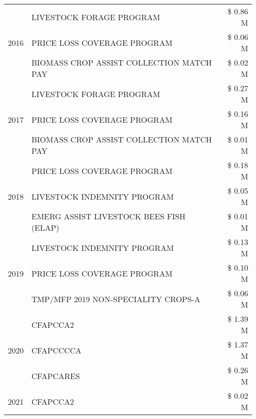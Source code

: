 \begin{tabular}{llr}
\cline{1-3}
\multirow[t]{3}{*}{2016} & LIVESTOCK FORAGE PROGRAM & \$ 0.86 M \\
 & PRICE LOSS COVERAGE PROGRAM & \$ 0.06 M \\
 & BIOMASS CROP ASSIST COLLECTION MATCH PAY & \$ 0.02 M \\
\cline{1-3}
\multirow[t]{3}{*}{2017} & LIVESTOCK FORAGE PROGRAM & \$ 0.27 M \\
 & PRICE LOSS COVERAGE PROGRAM & \$ 0.16 M \\
 & BIOMASS CROP ASSIST COLLECTION MATCH PAY & \$ 0.01 M \\
\cline{1-3}
\multirow[t]{3}{*}{2018} & PRICE LOSS COVERAGE PROGRAM & \$ 0.18 M \\
 & LIVESTOCK INDEMNITY PROGRAM & \$ 0.05 M \\
 & EMERG ASSIST LIVESTOCK BEES FISH (ELAP) & \$ 0.01 M \\
\cline{1-3}
\multirow[t]{3}{*}{2019} & LIVESTOCK INDEMNITY PROGRAM & \$ 0.13 M \\
 & PRICE LOSS COVERAGE PROGRAM & \$ 0.10 M \\
 & TMP/MFP 2019 NON-SPECIALITY CROPS-A & \$ 0.06 M \\
\cline{1-3}
\multirow[t]{3}{*}{2020} & CFAPCCA2 & \$ 1.39 M \\
 & CFAPCCCCA & \$ 1.37 M \\
 & CFAPCARES & \$ 0.26 M \\
\cline{1-3}
2021 & CFAPCCA2 & \$ 0.02 M \\
\cline{1-3}
\bottomrule
\end{tabular}
